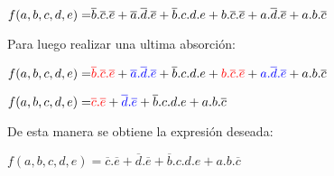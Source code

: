 $
\color{black}{f(a,b,c,d,e) =}  \overline{b}.\overline{c}.\overline{e} + \overline{a}.\overline{d}.\overline{e} + \overline{b}.c.d.e + b.\overline{c}.\overline{e} + a.\overline{d}.\overline{e} + a.b.\overline{c}$
\vspace{5mm}\par

Para luego realizar una ultima absorci\'on:\vspace{5mm}\par

$
\color{black}{f(a,b,c,d,e) =}  \color{red}{\overline{b}.\overline{c}.\overline{e}} \color{black}+ \color{blue}{\overline{a}.\overline{d}.\overline{e}} \color{black}+ \color{black}{\overline{b}.c.d.e} \color{black}+ \color{red}{b.\overline{c}.\overline{e}} \color{black}+ \color{blue}{a.\overline{d}.\overline{e}} \color{black}+ \color{black}{a.b.\overline{c}}$
\vspace{5mm}\par


$
\color{black}{f(a,b,c,d,e) =}  \color{red}{\overline{c}.\overline{e}} \color{black}+ \color{blue}{\overline{d}.\overline{e}}\color{black} + \color{black}{\overline{b}.c.d.e} +  \color{black}{a.b.\overline{c}}$
\vspace{5mm}\par


\noindent
\color{black}De esta manera se obtiene la expresi\'on deseada:\par\vspace{3mm}

$f(a,b,c,d,e) =  \overline{c}.\overline{e} + \overline{d}.\overline{e} + \overline{b}.c.d.e + a.b.\overline{c}$
\vspace{5mm}\par